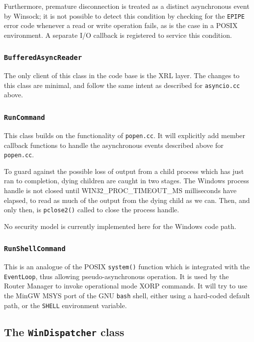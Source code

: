 \documentclass[11pt]{article}
\begin{document}
{Furthermore, premature disconnection is treated as a distinct
asynchronous event by Winsock; it is not possible to detect
this condition by checking for the {\tt EPIPE} error code
whenever a read or write operation fails, as is the case in
a POSIX environment. A separate I/O callback is registered to
service this condition.

\subsubsection{{\tt BufferedAsyncReader}}

The only client of
this class in the code base is the XRL layer.
The changes to this class are minimal, and follow the same intent
as described for {\tt asyncio.cc} above. 

\subsubsection{{\tt RunCommand}}

This class builds on the functionality of {\tt popen.cc}.
It will explicitly add member callback functions to handle the
asynchronous events described above for {\tt popen.cc}.

To guard against the possible loss of output from a child
process which has just ran to completion, dying children
are caught in two stages. The Windows process handle is not
closed until WIN32\_PROC\_TIMEOUT\_MS milliseconds have
elapsed, to read as much of the output from the dying child as we can.
Then, and only then, is {\tt pclose2()} called to close the
process handle.

No security model is currently implemented here for the Windows code path.

\subsubsection{{\tt RunShellCommand}}

This is an analogue of the POSIX {\tt system()} function which
is integrated with the {\tt EventLoop}, thus allowing pseudo-asynchronous
operation. It is used by the Router Manager to invoke operational mode XORP commands.
It will try to use the MinGW MSYS port of the GNU {\tt bash} shell, either
using a hard-coded default path, or the {\tt SHELL} environment variable.


\subsection{The {\tt WinDispatcher} class}

}
\end{document}
